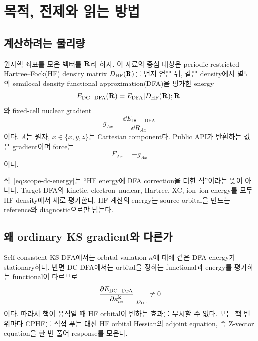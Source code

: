 \section{목적, 전제와 읽는 방법}
\label{sec:scope}

\subsection{계산하려는 물리량}

원자핵 좌표를 모은 벡터를 $\mathbf{R}$라 하자. 이 자료의 중심 대상은 periodic
restricted Hartree--Fock(HF) density matrix $D_{\mathrm{HF}}(\mathbf{R})$를 먼저 얻은 뒤,
같은 density에서 별도의 semilocal density functional approximation(DFA)을 평가한
energy
\begin{equation}
  E_{\mathrm{DC-DFA}}(\mathbf{R})
  = E_{\mathrm{DFA}}\!\left[D_{\mathrm{HF}}(\mathbf{R});\mathbf{R}\right]
  \label{eq:scope-dc-energy}
\end{equation}
와 fixed-cell nuclear gradient
\begin{equation}
  g_{Ax}
  = \frac{\dd E_{\mathrm{DC-DFA}}}{\dd R_{Ax}}
  \label{eq:scope-gradient}
\end{equation}
이다. $A$는 원자, $x\in\{x,y,z\}$는 Cartesian component다. Public API가 반환하는
값은 gradient이며 force는
\begin{equation}
  F_{Ax}=-g_{Ax}
  \label{eq:scope-force-sign}
\end{equation}
이다.

식~\eqref{eq:scope-dc-energy}는 ``HF energy에 DFA correction을 더한 식''이라는 뜻이
아니다. Target DFA의 kinetic, electron--nuclear, Hartree, XC, ion--ion energy를 모두
HF density에서 새로 평가한다. HF 계산의 energy는 source orbital을 만드는 reference와
diagnostic으로만 남는다.

\subsection{왜 ordinary KS gradient와 다른가}

Self-consistent KS-DFA에서는 orbital variation $\kappa$에 대해 같은 DFA energy가
stationary하다. 반면 DC-DFA에서는 orbital을 정하는 functional과 energy를 평가하는
functional이 다르므로
\begin{equation}
  \left.
  \frac{\partial E_{\mathrm{DC-DFA}}}{\partial\kappa_{ai}^{\mathbf{k}}}
  \right|_{D_{\mathrm{HF}}}
  \ne 0
  \label{eq:scope-nonstationary}
\end{equation}
이다. 따라서 핵이 움직일 때 HF orbital이 변하는 효과를 무시할 수 없다. 모든 핵
변위마다 CPHF를 직접 푸는 대신 HF orbital Hessian의 adjoint equation, 즉 Z-vector
equation을 한 번 풀어 response를 모은다.

